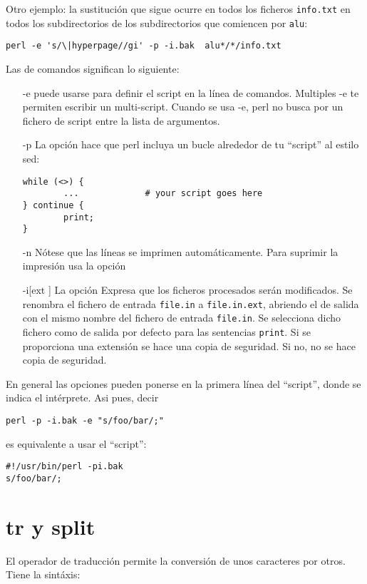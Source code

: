 Otro ejemplo: la sustitución que sigue ocurre en todos los ficheros \verb|info.txt| en todos
los subdirectorios de los subdirectorios que comiencen por \verb|alu|:

\begin{verbatim}
perl -e 's/\|hyperpage//gi' -p -i.bak  alu*/*/info.txt
\end{verbatim}

Las  de comandos significan lo siguiente:

\begin{itemize}
\item[-e] puede usarse para definir el script en la línea de comandos. Multiples -e te permiten escribir un multi-script. Cuando se usa -e, perl
      no busca por un fichero de script entre la lista de argumentos. 

\item[-p] La opción  hace que perl incluya un bucle alrededor de tu ``script'' al estilo sed: 
\begin{verbatim}
while (<>) {
        ...             # your script goes here
} continue {
        print;
}
\end{verbatim}
\item[-n] Nótese que las líneas se imprimen automáticamente. Para suprimir la impresión usa la opción 

\item[-i[ext]] La opción  Expresa que los ficheros procesados serán modificados. Se renombra el fichero de entrada \verb|file.in| a \verb|file.in.ext|, abriendo el de salida con el mismo nombre del fichero de entrada \verb|file.in|.
      Se selecciona dicho fichero como de salida por defecto para las sentencias \verb|print|. Si se proporciona una extensión se hace una copia de seguridad. Si no, no se hace copia de seguridad.
\end{itemize}

En general las opciones pueden ponerse en la primera
línea del ``script'', donde se indica el intérprete. 
Asi pues, decir 

\verb|perl -p -i.bak -e "s/foo/bar/;"| 

es equivalente a usar el ``script'': 
\begin{verbatim}
#!/usr/bin/perl -pi.bak
s/foo/bar/;
\end{verbatim}

\section{tr y split}
\label{section:tr}
El operador de traducción permite la conversión de unos caracteres por otros. 
Tiene la sintáxis:

